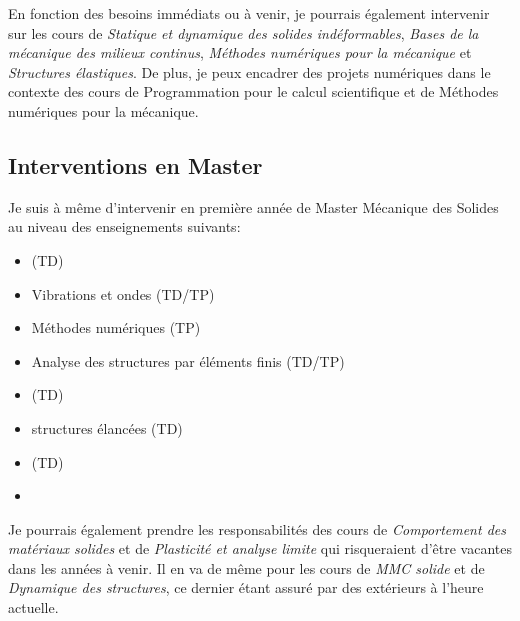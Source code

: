 En fonction des besoins immédiats ou à venir, je pourrais également intervenir sur les cours de \textit{Statique et dynamique des solides indéformables}, \textit{Bases de la mécanique des milieux continus}, \textit{Méthodes numériques pour la mécanique} et \textit{Structures élastiques}.
De plus, je peux encadrer des projets numériques dans le contexte des cours de Programmation pour le calcul scientifique et de Méthodes numériques pour la mécanique.


\subsection*{Interventions en Master}
\label{sec:interv-en-licence}

Je suis à même d'intervenir en première année de Master Mécanique des Solides au niveau des enseignements suivants:
\begin{itemize}
\item {} (TD)
\item Vibrations et ondes (TD/TP)
\item Méthodes numériques (TP)
\item Analyse des structures par éléments finis (TD/TP)
\item {} (TD)
\item structures élancées (TD) 
\item {} (TD)  
\item {}
\end{itemize}

Je pourrais également prendre les responsabilités des cours de \textit{Comportement des matériaux solides} et de \textit{Plasticité et analyse limite} qui risqueraient d'être vacantes dans les années à venir. 
Il en va de même pour les cours de \textit{MMC solide} et de \textit{Dynamique des structures}, ce dernier étant assuré par des extérieurs à l'heure actuelle. 


